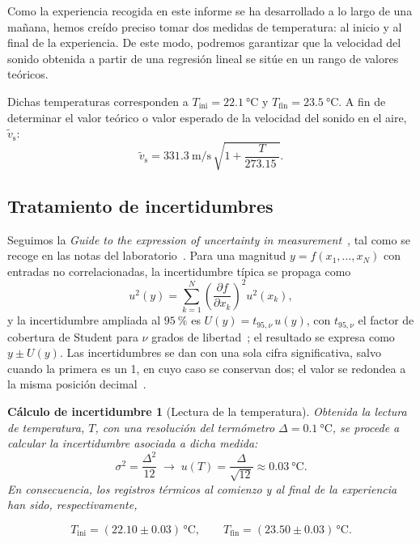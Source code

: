 \documentclass[a4paper,11pt]{amsart}
\numberwithin{equation}{section}
\newcommand{\vst}{\tilde{v}_{\mathrm{s}}}     %
\newcommand{\ext}[1]{U(#1)}                   %
\theoremstyle{cienplano}
\theoremstyle{ciendef}
\newtheorem{calculo}[proposicion]{Cálculo de incertidumbre}
\theoremstyle{cienobs}
\begin{document}
Como la experiencia recogida en este informe se ha desarrollado a lo largo de una mañana, hemos creído preciso tomar dos medidas de temperatura: al inicio y al final de la experiencia. De este modo, podremos garantizar que la velocidad del sonido obtenida a partir de una regresión lineal se sitúe en un rango de valores teóricos.

Dichas temperaturas corresponden a $T_{\mathrm{ini}}=\SI{22,1}{\celsius}$ y $T_{\mathrm{fin}}=\SI{23,5}{\celsius}$.
A fin de determinar el
valor teórico o valor esperado de la velocidad del sonido en el aire,
$\vst$:
\begin{equation}\label{eq:vs}
  \vst = \SI{331,3}{\meter\per\second}\,\sqrt{1+\frac{T}{\SI{273,15}{}}}.
\end{equation}

\subsection{Tratamiento de incertidumbres}\label{sec:incertidumbres}
Seguimos la \emph{Guide to the expression of uncertainty in
measurement}~\cite{GUM}, tal como se recoge en las notas del
laboratorio~\cite{NUM-ARG}. Para una magnitud $y=f(x_1,\dots,x_N)$ con
entradas no correlacionadas, la incertidumbre típica se propaga como
\begin{equation}\label{eq:propagacion}
  u^{2}(y)=\sum_{k=1}^{N}\left(\frac{\partial f}{\partial x_k}\right)^{\!2}u^{2}(x_k),
\end{equation}
y la incertidumbre ampliada al $\SI{95}{\percent}$ es $\ext{y}=t_{95,\nu}\,u(y)$,
con $t_{95,\nu}$ el factor de cobertura de Student para $\nu$ grados de
libertad~\cite{NUM-ARG}; el resultado se expresa como $y\pm\ext{y}$.
Las incertidumbres se dan con una sola cifra significativa, salvo cuando la
primera es un 1, en cuyo caso se conservan dos; el valor se redondea a la
misma posición decimal~\cite{ERR-MP}.

\begin{calculo}[Lectura de la temperatura]\label{calc:T}
Obtenida la lectura de temperatura, $T$, con una resolución del termómetro
$\Delta=\SI{0,1}{\celsius}$, se procede a calcular la incertidumbre asociada a
dicha medida:
\begin{equation}\label{eq:uT}
  \sigma^{2}=\frac{\Delta^{2}}{12}
  \;\longrightarrow\;
  u(T)=\frac{\Delta}{\sqrt{12}}\approx\SI{0,03}{\celsius}.
\end{equation}
En consecuencia, los registros térmicos al comienzo y al final de la experiencia han sido, respectivamente,
\begin{destacado}
\vspace{-6pt}
\begin{equation*}
  T_{\mathrm{ini}}=(\num{22,10}\pm\num{0,03})\,\si{\celsius},
  \qquad
  T_{\mathrm{fin}}=(\num{23,50}\pm\num{0,03})\,\si{\celsius}.
\end{equation*}
\end{destacado}
\end{calculo}
\end{document}
